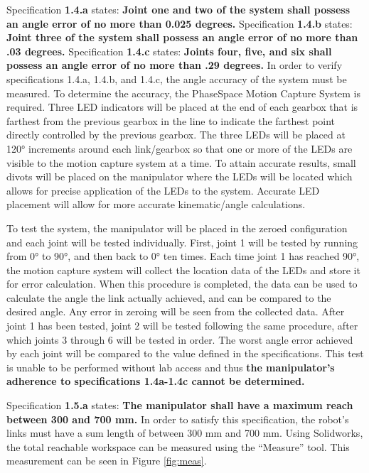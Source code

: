 \newpage
Specification \textbf{1.4.a} states: \textbf{Joint one and two of the system shall possess an angle error of no more than 0.025 degrees.} Specification \textbf{1.4.b} states: \textbf{Joint three of the system shall possess an angle error of no more than .03 degrees.} Specification \textbf{1.4.c} states: \textbf{Joints four, five, and six shall possess an angle error of no more than .29 degrees.} In order to verify specifications 1.4.a, 1.4.b, and 1.4.c, the angle accuracy of the system must be measured. To determine the accuracy, the PhaseSpace Motion Capture System is required. Three LED indicators will be placed at the end of each gearbox that is farthest from the previous gearbox in the line to indicate the farthest point directly controlled by the previous gearbox. The three LEDs will be placed at 120° increments around each link/gearbox so that one or more of the LEDs are visible to the motion capture system at a time. To attain accurate results, small divots will be placed on the manipulator where the LEDs will be located which allows for precise application of the LEDs to the system. Accurate LED placement will allow for more accurate kinematic/angle calculations.

To test the system, the manipulator will be placed in the zeroed configuration and each joint will be tested individually. First, joint 1 will be tested by running from 0° to 90°, and then back to 0° ten times. Each time joint 1 has reached 90°, the motion capture system will collect the location data of the LEDs and store it for error calculation. When this procedure is completed, the data can be used to calculate the angle the link actually achieved, and can be compared to the desired angle. Any error in zeroing will be seen from the collected data. After joint 1 has been tested, joint 2 will be tested following the same procedure, after which joints 3 through 6 will be tested in order. The worst angle error achieved by each joint will be compared to the value defined in the specifications. This test is unable to be performed without lab access and thus \textbf{the manipulator’s adherence to specifications 1.4a-1.4c cannot be determined.}


Specification \textbf{1.5.a} states: \textbf{The manipulator shall have a maximum reach between 300 and 700 mm.} In order to satisfy this specification, the robot’s links must have a sum length of between 300 mm and 700 mm. Using Solidworks, the total reachable workspace can be measured using the “Measure” tool. This measurement can be seen in Figure \ref{fig:meas}.

